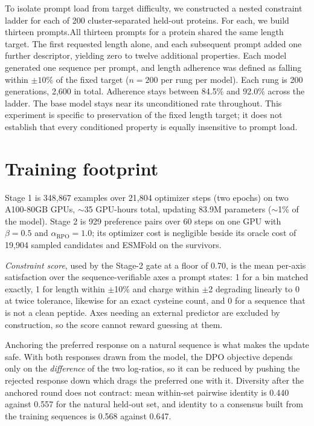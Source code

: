 \documentclass{article}
\newcommand{\pct}{\%}
\begin{document}
To isolate prompt load from target difficulty, we constructed a nested constraint ladder for each of 200 cluster-separated held-out proteins. For each, we build thirteen prompts.All thirteen prompts for a protein shared the same length target. The first requested length alone, and each subsequent prompt added one further descriptor, yielding zero to twelve additional properties. Each model generated one sequence per prompt, and length adherence was defined as falling within $\pm10\pct{}$ of the fixed target ($n=200$ per rung per model). Each
rung is 200 generations, 2{,}600 in total. Adherence stays between 84.5\pct{}
and 92.0\pct{} across the ladder. The base model stays
near its unconditioned rate throughout. This experiment is specific to preservation of the fixed length target; it does not establish that every conditioned property is equally insensitive to prompt load.

\section{Training footprint}\label{app:compute}
Stage 1 is 348{,}867 examples over 21{,}804 optimizer steps (two epochs) on two
A100-80GB GPUs, $\sim$35 GPU-hours total, updating 83.9M
parameters ($\sim$1\pct{} of the model). Stage 2 is 929 preference pairs over 60
steps on one GPU with $\beta = 0.5$ and $\alpha_{\text{RPO}} = 1.0$; its
optimizer cost is negligible beside its oracle cost of 19{,}904 sampled
candidates and ESMFold on the survivors.

\emph{Constraint score}, used by the Stage-2 gate at a floor of 0.70, is the
mean per-axis satisfaction over the sequence-verifiable axes a prompt states: 1
for a bin matched exactly, 1 for length within $\pm$10\pct{} and charge within
$\pm$2 degrading linearly to 0 at twice tolerance, likewise for an exact
cysteine count, and 0 for a sequence that is not a clean peptide. Axes needing
an external predictor are excluded by construction, so the score cannot reward
guessing at them.

Anchoring the preferred response on a natural sequence is what makes the update
safe. With both responses drawn from the model, the DPO objective depends only
on the \emph{difference} of the two log-ratios, so it can be reduced by pushing
the rejected response down which drags the preferred one with it. Diversity after
the anchored round does not contract: mean within-set pairwise identity is 0.440
against 0.557 for the natural held-out set, and identity to a consensus built
from the training sequences is 0.568 against 0.647.
\end{document}
